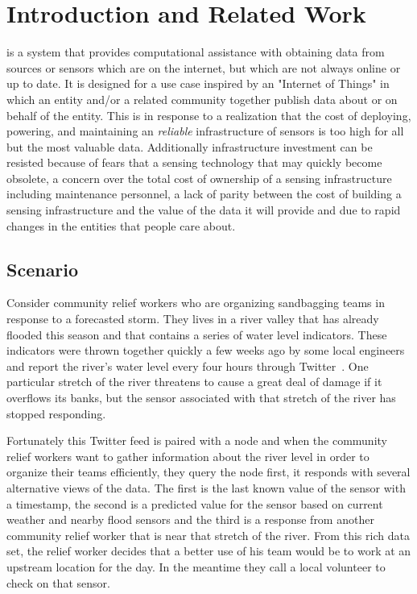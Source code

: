 \section{Introduction and Related Work}

\Cacophony is a system that provides computational assistance with obtaining
data from sources or sensors which are on the internet, but which are not always
online or up to date.  It is designed for a use case inspired by an "Internet of
Things" in which an entity and/or a related community together publish data
about or on behalf of the entity.  This is in response to a realization that the
cost of deploying, powering, and maintaining an \emph{reliable} infrastructure of sensors is too
high for all but the most valuable data.  Additionally infrastructure investment
can be resisted because of fears that a sensing technology that may quickly become obsolete,  a
concern over the total cost of ownership of a sensing infrastructure including
maintenance personnel,  a lack of
parity between the cost of building a sensing infrastructure and the value of
the data it will provide and due to rapid changes in the entities that people care about.

\subsection{Scenario}

Consider community relief workers who are organizing sandbagging teams in
response to a forecasted storm.  They lives in a river valley that has already
flooded this season and that contains a series of water level indicators.  These
indicators were thrown together quickly a few weeks ago by some local engineers
and report the
river's water level every four hours through Twitter~\cite{Starbird2010,flood}.
One particular stretch of the river threatens to cause a great deal of damage if it
overflows its banks, but the sensor associated with that stretch of the river
has stopped responding.

Fortunately this Twitter feed is paired with a \Cacophony node and when the
community relief workers want to gather information about the river level in
order to organize their teams efficiently, they query the \Cacophony node first,
it responds with several alternative views of the data.  The first is the last
known value of the sensor with a timestamp, the second is a predicted value for
the sensor based on current weather and nearby flood sensors and the third is a
response from another community relief worker that is near that stretch of the
river.  From this rich data set, the relief worker decides that a better use of
his team would be to work at an upstream location for the day.  In the meantime
they call a local volunteer to check on that sensor.

